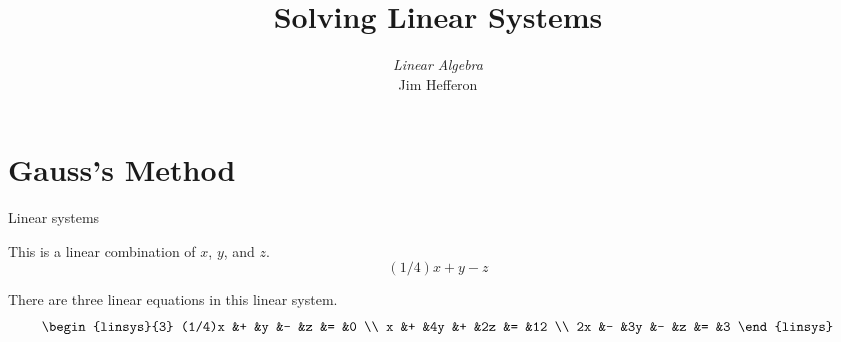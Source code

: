 \documentclass[10pt,t,serif]{beamer}
\title[Solving Linear Systems] %
{Solving Linear Systems}
\author{\textit{Linear Algebra} \\ {\small Jim Hef{}feron}}
\institute{
  \texttt{http://joshua.smcvt.edu/linearalgebra}
}
\date{}
\begin{document}
\begin{frame}
  \titlepage
\end{frame}




\section{Gauss's Method}
\begin{frame}{Linear systems} 

\ex This is a linear combination of $x$, $y$, and $z$.
\begin{equation*}
   (1/4)x+y-z
\end{equation*}
\end{frame}


\begin{frame}
\ex 
There are three linear equations in this linear system.
\begin{equation*}
  \begin{linsys}{3}
   (1/4)x  &+  &y  &-  &z  &=  &0  \\
        x  &+  &4y &+  &2z &=  &12  \\
       2x  &-  &3y &-  &z  &=  &3  
  \end{linsys}  
\end{equation*}
\end{frame}
\end{document}
